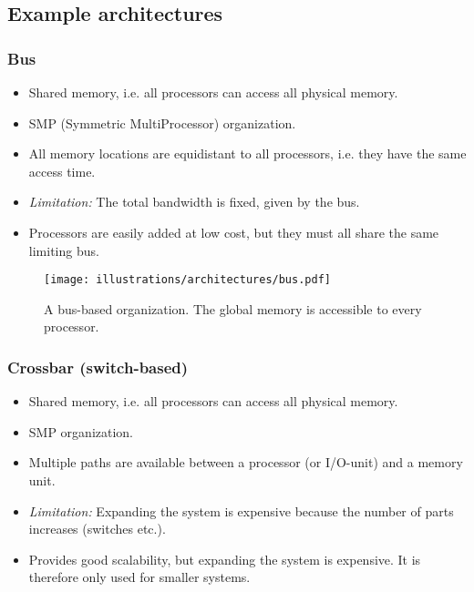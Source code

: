 
\subsection{Example architectures} %
\label{sub:example_architectures}

\subsubsection{Bus} %
\label{ssub:bus}

\begin{itemize}
  \item Shared memory, i.e. all processors can access all physical memory.
  \item SMP (Symmetric MultiProcessor) organization.
  \item All memory locations are equidistant to all processors, i.e. they have the same access time.
  \item \emph{Limitation:} The total bandwidth is fixed, given by the bus.
  \item Processors are easily added at low cost, but they must all share the same limiting bus.
\end{itemize}

\begin{figure}[htbp]
  \centering
  \texttt{[image: illustrations/architectures/bus.pdf]}
  \caption{A bus-based organization. The global memory is accessible to every processor.}
  \label{fig:bus}
\end{figure}



\subsubsection{Crossbar (switch-based)} %

\begin{itemize}
\label{ssub:crossbar}

  \item Shared memory, i.e. all processors can access all physical memory.
  \item SMP organization.
  \item Multiple paths are available between a processor (or I/O-unit) and a memory unit.
  \item \emph{Limitation:} Expanding the system is expensive because the number of parts increases (switches etc.).
  \item Provides good scalability, but expanding the system is expensive. It is therefore only used for smaller systems.
\end{itemize}

